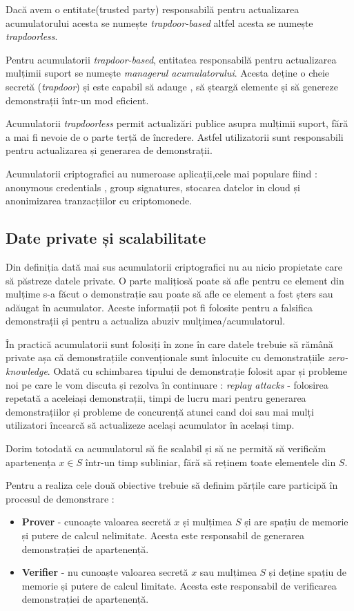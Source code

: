 \documentclass[12pt, letterpaper]{article}
\begin{document}
Dacă avem o entitate(trusted party) responsabilă pentru actualizarea acumulatorului acesta se numește \emph{trapdoor-based} altfel acesta se numește \emph{trapdoorless}.

Pentru acumulatorii \emph{trapdoor-based}, entitatea responsabilă pentru actualizarea mulțimii suport se numește \emph{managerul acumulatorului}. Acesta deține o cheie secretă (\emph{trapdoor}) și este capabil să adauge , să șteargă elemente și să genereze demonstrații într-un mod eficient.

Acumulatorii \emph{trapdoorless} permit actualizări publice asupra mulțimii suport, fără a mai fi nevoie de o parte terță de încredere. Astfel utilizatorii sunt responsabili pentru actualizarea și generarea de demonstrații.


Acumulatorii criptografici au numeroase aplicații,cele mai populare fiind : anonymous credentials , group signatures, stocarea datelor in cloud și anonimizarea tranzacțiilor cu criptomonede.
\cite{cryptoeprint:2023/1001}

\subsection{Date private și scalabilitate}

Din definiția dată mai sus acumulatorii criptografici nu au nicio propietate care să păstreze datele private. O parte malițiosă poate să afle pentru ce element din mulțime s-a făcut o demonstrație sau poate să afle ce element a fost șters sau adăugat în acumulator. Aceste informații pot fi folosite pentru a falsifica demonstrații și pentru a actualiza abuziv mulțimea/acumulatorul.

În practică acumulatorii sunt folosiți în zone în care datele trebuie să rămână private așa că demonstrațiile convenționale sunt înlocuite cu demonstrațiile \emph{zero-knowledge}. Odată cu schimbarea tipului de demonstrație folosit apar și probleme noi pe care le vom discuta și rezolva în continuare : \emph{replay attacks} - folosirea repetată a aceleiași demonstrații, timpi de lucru mari pentru generarea demonstrațiilor și probleme de concurență atunci cand doi sau mai mulți utilizatori încearcă să actualizeze același acumulator în același timp.

Dorim totodată ca acumulatorul să fie scalabil și să ne permită să verificăm apartenența $x \in S$ într-un timp subliniar, fără să reținem toate elementele din $S$.

Pentru a realiza cele două obiective trebuie să definim părțile care participă în procesul de demonstrare : 
\begin{itemize}
    \item{\textbf{Prover} - cunoaște valoarea secretă $x$ și mulțimea $S$ și are spațiu de memorie și putere de calcul nelimitate. Acesta este responsabil de generarea demonstrației de apartenență.}
    \item{\textbf{Verifier} - nu cunoaște valoarea secretă $x$ sau mulțimea $S$ și deține spațiu de memorie și putere de calcul limitate. Acesta este responsabil de verificarea demonstrației de apartenență.  }
\end{itemize}
\end{document}

